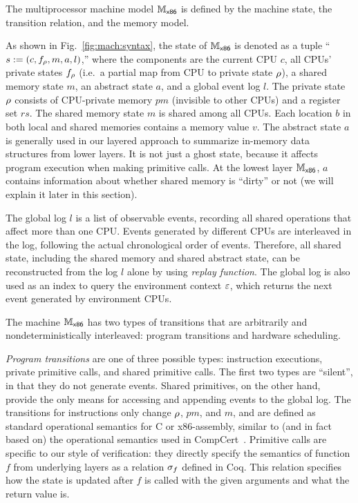 The multiprocessor machine model $\mathbb{M}_{\mathsf{x86}}$ is defined by the machine state, the  transition relation, and the memory model.

 As shown in Fig.~\ref{fig:mach:syntax},  the state of $\mathbb{M}_{\mathsf{x86}}$ is denoted as a tuple ``$s := (c, f_\rho, m, a, l)$,''
where the components are
the current CPU \allid{} $c$,
all CPUs' private states $f_\rho$
(i.e.\, a partial map from CPU \allid{} to private state $\rho$),
a shared memory state $m$,
an abstract state $a$, and a global event log $l$.
The private state $\rho$ consists of CPU-private memory $pm$
(invisible to other CPUs) and a register set $rs$.
The shared memory state  $m$ is shared among all CPUs.
Each location $b$ in both local and shared memories
contains a memory value $v$.
The abstract state $a$ is generally used in our layered approach to
summarize in-memory data structures from lower layers. It is not just
a ghost state, because it affects program execution when making
primitive calls. 
At the lowest layer $\mathbb{M}_{\mathsf{x86}}$, $a$ contains
information about whether shared memory is ``dirty'' or not (we will explain it later in
this section).

The global log $l$ is a list of observable events, 
recording all shared operations that affect more than
one CPU.
Events generated by different CPUs are
interleaved in the log, following the actual chronological order of events.
Therefore, all shared state, including the shared memory
and shared abstract state, can be reconstructed
from the log $l$ alone by using \emph{replay function}.
The global log is also used as an index to query the environment context
$\oracle$, which returns the next event generated by environment CPUs.



 The machine $\mathbb{M}_{\mathsf{x86}}$
has two types of transitions that are arbitrarily and nondeterministically 
interleaved: 
program transitions and hardware scheduling.

\emph{Program transitions} are one of three possible types:
instruction executions, private primitive calls, and shared primitive calls.
The first two types are ``silent'', in that they do not
generate events.
Shared primitives, on the other hand, provide the only means 
for accessing and appending events to the global log.
The transitions for instructions only change $\rho$, $pm$, and $m$, and are defined as standard operational semantics
for C or x86-assembly, similar to (and in fact based on) the
operational semantics used in
CompCert~\cite{leroy09}. 
Primitive calls are specific to our style of verification: they
directly specify the semantics of function $f$ from underlying layers as a relation $\sigma_f$
defined in Coq. This relation specifies how the state is updated after $f$
is called with the given arguments and what the return value is.

